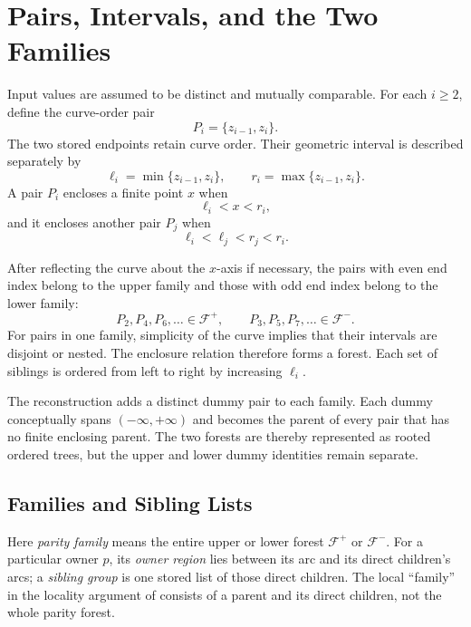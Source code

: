 \section{Pairs, Intervals, and the Two Families}
\label{sec:algorithm-families}

Input values are assumed to be distinct and mutually comparable. For each
$i\geq 2$, define the curve-order pair
\begin{equation}
  P_i=\{z_{i-1},z_i\}.
\end{equation}
The two stored endpoints retain curve order. Their geometric interval is
described separately by
\begin{equation}
  \ell_i=\min\{z_{i-1},z_i\},
  \qquad
  r_i=\max\{z_{i-1},z_i\}.
\end{equation}
A pair $P_i$ encloses a finite point $x$ when
\begin{equation}
  \ell_i < x < r_i,
\end{equation}
and it encloses another pair $P_j$ when
\begin{equation}
  \ell_i < \ell_j < r_j < r_i.
\end{equation}

After reflecting the curve about the $x$-axis if necessary, the pairs with
even end index belong to the upper family and those with odd end index belong
to the lower family:
\begin{equation}
  P_{2},P_{4},P_{6},\ldots \in \mathcal{F}^{+},
  \qquad
  P_{3},P_{5},P_{7},\ldots \in \mathcal{F}^{-}.
\end{equation}
For pairs in one family, simplicity of the curve implies that their intervals
are disjoint or nested. The enclosure relation therefore forms a forest. Each
set of siblings is ordered from left to right by increasing $\ell_i$.

The reconstruction adds a distinct dummy pair to each family. Each dummy
conceptually spans $(-\infty,+\infty)$ and becomes the parent of every pair
that has no finite enclosing parent. The two forests are thereby represented
as rooted ordered trees, but the upper and lower dummy identities remain
separate.

\subsection{Families and Sibling Lists}
\label{sec:algorithm-sibling-lists}

Here \emph{parity family} means the entire upper or lower forest
$\mathcal F^+$ or $\mathcal F^-$. For a particular owner $p$, its
\emph{owner region} lies between its arc and its direct children's arcs;
a \emph{sibling group} is one stored list of those direct children.
The local ``family'' in the locality argument of
\textcite[pp.~87--88]{fung1990simplified} consists of a parent and its direct
children, not the whole parity forest.

